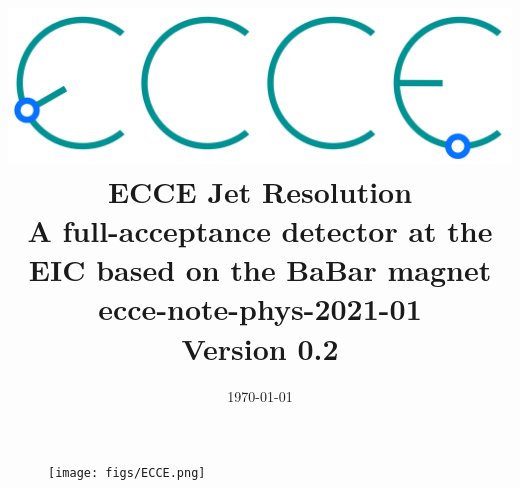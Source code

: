 \renewcommand*\familydefault{\sfdefault}
{\sffamily

\title{\includegraphics[width=0.3\linewidth]{figs/ecce-logo.png}\\ \vspace{0.4pt}
        ECCE Jet Resolution\\
        \large A full-acceptance detector at the EIC based on the BaBar magnet\\
        ecce-note-phys-2021-01\\
        Version 0.2}
\date{\today}
\maketitle


\begin{figure}[H]
  \begin{center}
    \texttt{[image: figs/ECCE.png]}
  \end{center}
\end{figure}
}


\renewcommand*\familydefault{\rmdefault}
